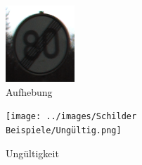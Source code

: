 \begin{figure}[H]
   \centering
   \captionsetup[subfigure]{labelformat=empty}
   \begin{subfigure}[b]{0.125\textwidth}
       \centering
       \includegraphics[height=\textwidth]{../images/Schilder Beispiele/Aufhebungsschild.png}
       \caption{Aufhebung}
       \label{fig:aufhebungsschild}
   \end{subfigure}
   \hspace{3em}%
   \begin{subfigure}[b]{0.125\textwidth}
       \centering
       \texttt{[image: ../images/Schilder Beispiele/Ungültig.png]}
       \caption{Ungültigkeit}
       \label{fig:abgeklebt}
   \end{subfigure}
   \hspace{3em}%
   \begin{subfigure}[b]{0.125\textwidth}
       \centering

\end{subfigure}
\end{figure}
